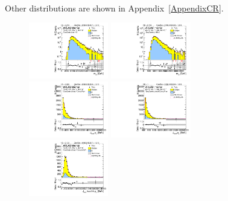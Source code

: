 \paragraph{}
Other distributions are shown in Appendix~\ref{AppendixCR}.
\begin{figure}[htbp!]
\begin{center}
\includegraphics[width=0.31\textwidth,angle=-90]{figures/boosted/Prereweight/Moriond_TwoTag_split_Control_mHH_l_1.pdf}
\includegraphics[width=0.31\textwidth,angle=-90]{figures/boosted/Control/b77_TwoTag_split_Control_mHH_l_1.pdf}\\
\includegraphics[width=0.31\textwidth,angle=-90]{figures/boosted/Prereweight/Moriond_TwoTag_split_Control_leadHCand_Pt_m.pdf}
\includegraphics[width=0.31\textwidth,angle=-90]{figures/boosted/Control/b77_TwoTag_split_Control_leadHCand_Pt_m.pdf}\\
\includegraphics[width=0.31\textwidth,angle=-90]{figures/boosted/Prereweight/Moriond_TwoTag_split_Control_leadHCand_trk0_Pt.pdf}

\end{center}
\end{figure}
